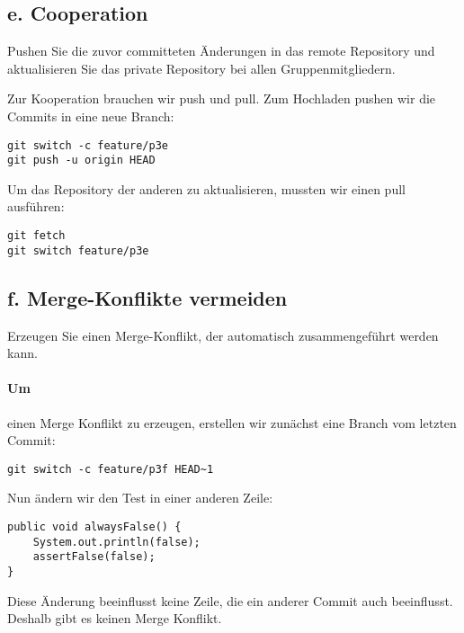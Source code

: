 \subsection{e. Cooperation}\label{subsec:e.-cooperation}
Pushen Sie die zuvor committeten Änderungen in das remote Repository und aktualisieren Sie das private Repository bei allen Gruppenmitgliedern.

Zur Kooperation brauchen wir push und pull.
Zum Hochladen pushen wir die Commits in eine neue Branch:
\begin{lstlisting}[label={lst:push-p3e}, caption={Hochladen der Änderungen aus\ \ref{subsec:d.-mehrere-commits}}]
git switch -c feature/p3e
git push -u origin HEAD
\end{lstlisting}

Um das Repository der anderen zu aktualisieren, mussten wir einen pull ausführen:
\begin{lstlisting}[label={lst:pull-p3e}, caption={Herunterladen der Änderungen aus \ \ref{subsec:d.-mehrere-commits}}]
git fetch
git switch feature/p3e
\end{lstlisting}

\subsection{f. Merge-Konflikte vermeiden}\label{subsec:f.-merge-konflikte-vermeiden}
Erzeugen Sie einen Merge-Konflikt, der automatisch zusammengeführt werden kann.

\paragraph{Um} einen Merge Konflikt zu erzeugen, erstellen wir zunächst eine Branch vom letzten Commit:
\begin{lstlisting}[label={lst:create-p3f}, caption={Erstellen einer neuen Branch ohne Mergekonflikte}]
git switch -c feature/p3f HEAD~1
\end{lstlisting}

Nun ändern wir den Test in einer anderen Zeile:
\begin{lstlisting}[label={lst:change-false-test}, caption={Erstellen einer Änderung ohne Mergekonflikte}]
public void alwaysFalse() {
    System.out.println(false);
    assertFalse(false);
}
\end{lstlisting}

Diese Änderung beeinflusst keine Zeile, die ein anderer Commit auch beeinflusst.
Deshalb gibt es keinen Merge Konflikt.

